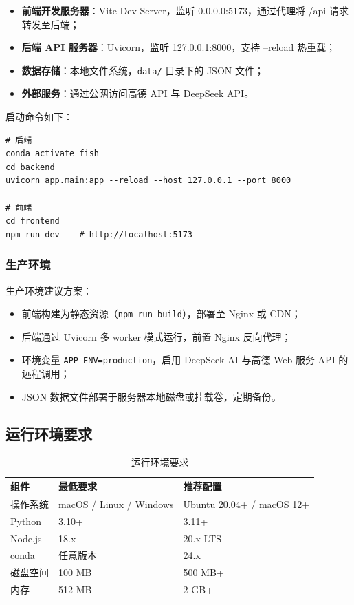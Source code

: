 \documentclass[12pt,a4paper]{ctexart}
\begin{document}
\begin{itemize}
  \item \textbf{前端开发服务器}：Vite Dev Server，监听 0.0.0.0:5173，通过代理将 /api 请求转发至后端；
  \item \textbf{后端 API 服务器}：Uvicorn，监听 127.0.0.1:8000，支持 --reload 热重载；
  \item \textbf{数据存储}：本地文件系统，\texttt{data/} 目录下的 JSON 文件；
  \item \textbf{外部服务}：通过公网访问高德 API 与 DeepSeek API。
\end{itemize}

启动命令如下：

\begin{lstlisting}[caption={开发环境启动命令},label={lst:startup}]
# 后端
conda activate fish
cd backend
uvicorn app.main:app --reload --host 127.0.0.1 --port 8000

# 前端
cd frontend
npm run dev    # http://localhost:5173
\end{lstlisting}

\subsubsection{生产环境}

生产环境建议方案：
\begin{itemize}
  \item 前端构建为静态资源（\texttt{npm run build}），部署至 Nginx 或 CDN；
  \item 后端通过 Uvicorn 多 worker 模式运行，前置 Nginx 反向代理；
  \item 环境变量 \texttt{APP\_ENV=production}，启用 DeepSeek AI 与高德 Web 服务 API 的远程调用；
  \item JSON 数据文件部署于服务器本地磁盘或挂载卷，定期备份。
\end{itemize}

\subsection{运行环境要求}

\begin{table}[H]
  \centering
  \caption{运行环境要求}
  \label{tab:env-req}
  \begin{tabular}{p{3cm}p{4cm}p{5cm}}
    \toprule
    \textbf{组件} & \textbf{最低要求} & \textbf{推荐配置} \\
    \midrule
    操作系统 & macOS / Linux / Windows & Ubuntu 20.04+ / macOS 12+ \\
    Python & 3.10+ & 3.11+ \\
    Node.js & 18.x & 20.x LTS \\
    conda & 任意版本 & 24.x \\
    磁盘空间 & 100 MB & 500 MB+ \\
    内存 & 512 MB & 2 GB+ \\
    \bottomrule
  \end{tabular}
\end{table}
\end{document}
